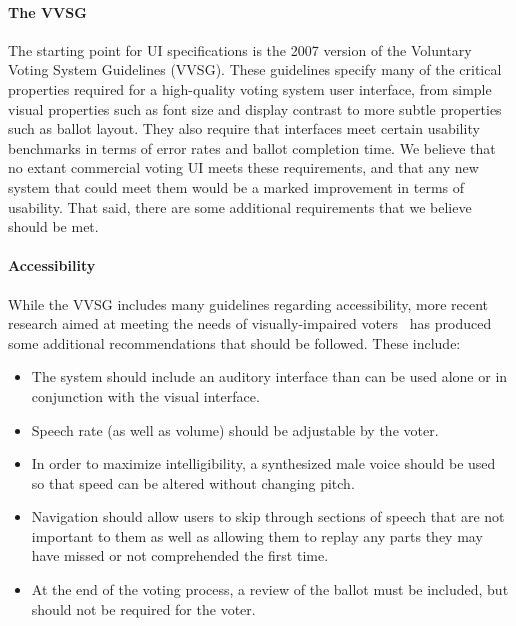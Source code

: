 \paragraph{The VVSG}
The starting point for UI specifications is the 2007 version of the Voluntary Voting System Guidelines (VVSG). These guidelines specify many of the critical properties required for a high-quality voting system user interface, from simple visual properties such as font size and display contrast to more subtle properties such as ballot layout. They also require that interfaces meet certain usability benchmarks in terms of error rates and ballot completion time. We believe that no extant commercial voting UI meets these requirements, and that any new system that could meet them would be a marked improvement in terms of usability. That said, there are some additional requirements that we believe should be met. 
\paragraph{Accessibility}
While the VVSG includes many guidelines regarding accessibility, more recent research aimed at meeting the needs of visually-impaired voters~\cite{piner-11} has produced some additional recommendations that should be followed. These include:
\begin{itemize}
\item  The system should include an auditory interface than can be used alone or in conjunction with the visual interface. 
\item Speech rate (as well as volume) should be adjustable by the voter. 
\item In order to maximize intelligibility, a synthesized male voice should be used so that speed can be altered without changing pitch. 
\item Navigation should allow users to skip through sections of speech that are not important to them as well as allowing them to replay any parts they may have missed or not comprehended the first time.
\item At the end of the voting process, a review of the ballot must be included, but should not be required for the voter. 
\end{itemize}
